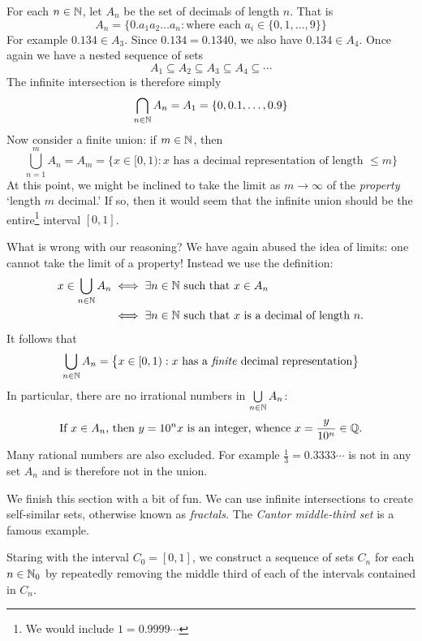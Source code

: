 For each $n\in\mathbb{N}$, let $A_n$ be the set of decimals of length $n$. That is
\[
	A_n=\bigl\{0.a_1a_2\ldots a_n:\text{where each $a_i\in\{0,1,\ldots,9\}$}\bigr\}
\]
For example $0.134\in A_3$. Since $0.134=0.1340$, we also have $0.134\in A_4$. Once again we have a nested sequence of sets
\[
	A_1\subseteq A_2\subseteq A_3\subseteq A_4\subseteq\cdots
\]
The infinite intersection is therefore simply
\[
	\bigcap_{n\in\mathbb{N}}A_n=A_1=\{0,0.1,\ldots,0.9\}
\]
Now consider a finite union: if $m\in\mathbb{N}$, then
\[
	\bigcup_{n=1}^mA_n=A_m=\bigl\{x\in [0,1):x\text{ has a decimal representation of length $\le m$}\bigr\}
\]
At this point, we might be inclined to take the limit as $m\to\infty$ of the \emph{property} `length $m$ decimal.' If so, then it would seem that the infinite union should be the entire\footnote{We would include $1=0.9999\cdots$} interval $[0,1]$.\par
What is wrong with our reasoning? We have again abused the idea of limits: one cannot take the limit of a property! Instead we use the definition:
\begin{align*}
	x\in\bigcup_{n\in\mathbb{N}}A_n&\iff\exists n\in\mathbb{N}\text{ such that }x\in A_n\\
	&\iff\exists n\in\mathbb{N} \text{ such that $x$ is a decimal of length $n$.}
\end{align*}
It follows that
\[
	\bigcup_{n\in\mathbb{N}}A_n=\big\{x\in[0,1):x\text{ has a \emph{finite} decimal representation}\big\}
\]
In particular, there are no irrational numbers in $\bigcup\limits_{n\in\mathbb{N}}A_n$:
\[
	\text{If $x\in A_n$, then $y=10^nx$ is an integer, whence $x=\frac y{10^n}\in\mathbb{Q}$.}
\]
Many rational numbers are also excluded. For example $\frac 13=0.3333\cdots$ is not in any set $A_n$ and is therefore not in the union.



We finish this section with a bit of fun. We can use infinite intersections to create self-similar sets, otherwise known as \emph{fractals.} The \emph{Cantor middle-third set} is a famous example.\par

Staring with the interval $C_0=[0,1]$, we construct a sequence of sets $C_n$ for each $n\in\mathbb{N}_0$ by repeatedly removing the middle third of each of the intervals contained in $C_n$.

